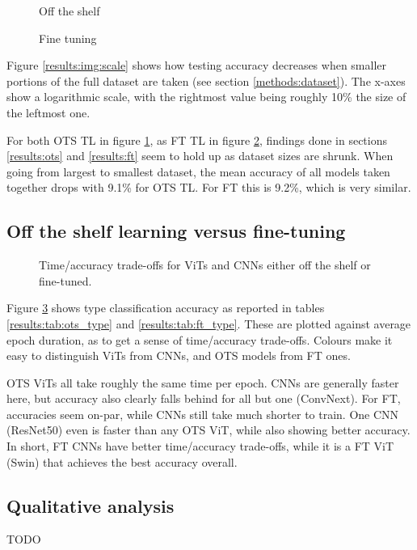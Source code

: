 \begin{figure*}
    \centering
    \begin{subfigure}{0.45\textwidth}
    \def\svgwidth{7.7cm}
    
    \caption{Off the shelf}
    \label{results:img:ots_scale}
    \end{subfigure}
    \hfill
    \begin{subfigure}{0.45\textwidth}
    \def\svgwidth{7.7cm}
    
    \caption{Fine tuning}
    \label{results:img:ft_scale}
    \end{subfigure}
    \caption{Testing accuracy as datasets become smaller.}
    \label{results:img:scale}
\end{figure*}

Figure \ref{results:img:scale} shows how testing accuracy decreases when smaller portions of the full dataset are taken (see section \ref{methods:dataset}). The x-axes show a logarithmic scale, with the rightmost value being roughly 10\% the size of the leftmost one.

For both OTS TL in figure \ref{results:img:ots_scale}, as FT TL in figure \ref{results:img:ft_scale}, findings done in sections \ref{results:ots} and \ref{results:ft} seem to hold up as dataset sizes are shrunk. When going from largest to smallest dataset, the mean accuracy of all models taken together drops with 9.1\% for OTS TL. For FT this is 9.2\%, which is very similar.

\subsection{Off the shelf learning versus fine-tuning}

\begin{figure}
    \centering
    \def\svgwidth{7.7cm}
    
    \caption{Time/accuracy trade-offs for ViTs and CNNs either off the shelf or fine-tuned.}
    \label{results:img:ots_vs_ft_type}
\end{figure}


Figure \ref{results:img:ots_vs_ft_type} shows type classification accuracy as reported in tables \ref{results:tab:ots_type} and \ref{results:tab:ft_type}. These are plotted against average epoch duration, as to get a sense of time/accuracy trade-offs. Colours make it easy to distinguish ViTs from CNNs, and OTS models from FT ones.

OTS ViTs all take roughly the same time per epoch. CNNs are generally faster here, but accuracy also clearly falls behind for all but one (ConvNext). For FT, accuracies seem on-par, while CNNs still take much shorter to train. One CNN (ResNet50) even is faster than any OTS ViT, while also showing better accuracy. In short, FT CNNs have better time/accuracy trade-offs, while it is a FT ViT (Swin) that achieves the best accuracy overall.

\subsection{Qualitative analysis}
TODO
